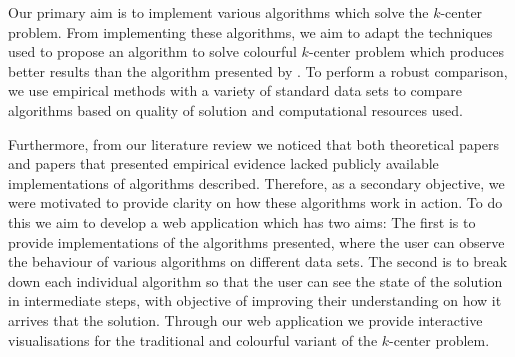 Our primary aim is to implement various algorithms which solve the $k$-center problem. From implementing these algorithms, we aim to adapt the techniques used to propose an algorithm to solve colourful $k$-center problem which produces better results than the algorithm presented by \textcite{bandyapadhyay_constant_2019}. To perform a robust comparison, we use empirical methods with a variety of standard data sets to compare algorithms based on quality of solution and computational resources used.

Furthermore, from our literature review we noticed that both theoretical papers and papers that presented empirical evidence lacked publicly available implementations of algorithms described. Therefore, as a secondary objective, we were motivated to provide clarity on how these algorithms work in action. To do this we aim to develop a web application which has two aims: The first is to provide implementations of the algorithms presented, where the user can observe the behaviour of various algorithms on different data sets. The second is to break down each individual algorithm so that the user can see the state of the solution in intermediate steps, with objective of improving their understanding on how it arrives that the solution. Through our web application we provide interactive visualisations for the traditional and colourful variant of the $k$-center problem.